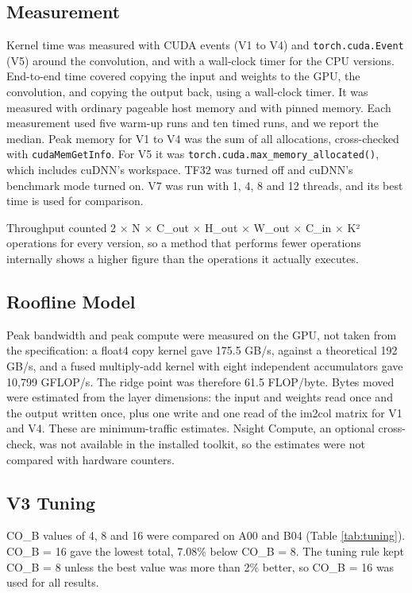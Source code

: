 \documentclass[12pt,a4paper]{article}
\begin{document}
\subsection{Measurement}
Kernel time was measured with CUDA events (V1 to V4) and \texttt{torch.cuda.Event} (V5) around the convolution, and with a wall-clock timer for the CPU versions. End-to-end time covered copying the input and weights to the GPU, the convolution, and copying the output back, using a wall-clock timer. It was measured with ordinary pageable host memory and with pinned memory. Each measurement used five warm-up runs and ten timed runs, and we report the median. Peak memory for V1 to V4 was the sum of all allocations, cross-checked with \texttt{cudaMemGetInfo}. For V5 it was \texttt{torch.cuda.max\_memory\_allocated()}, which includes cuDNN's workspace. TF32 was turned off and cuDNN's benchmark mode turned on. V7 was run with 1, 4, 8 and 12 threads, and its best time is used for comparison.

Throughput counted 2 × N × C\_out × H\_out × W\_out × C\_in × K² operations for every version, so a method that performs fewer operations internally shows a higher figure than the operations it actually executes.

\subsection{Roofline Model}
Peak bandwidth and peak compute were measured on the GPU, not taken from the specification: a float4 copy kernel gave 175.5 GB/s, against a theoretical 192 GB/s, and a fused multiply-add kernel with eight independent accumulators gave 10,799 GFLOP/s. The ridge point was therefore 61.5 FLOP/byte. Bytes moved were estimated from the layer dimensions: the input and weights read once and the output written once, plus one write and one read of the im2col matrix for V1 and V4. These are minimum-traffic estimates. Nsight Compute, an optional cross-check, was not available in the installed toolkit, so the estimates were not compared with hardware counters.

\subsection{V3 Tuning}
CO\_B values of 4, 8 and 16 were compared on A00 and B04 (Table \ref{tab:tuning}). CO\_B = 16 gave the lowest total, 7.08\% below CO\_B = 8. The tuning rule kept CO\_B = 8 unless the best value was more than 2\% better, so CO\_B = 16 was used for all results.
\end{document}
